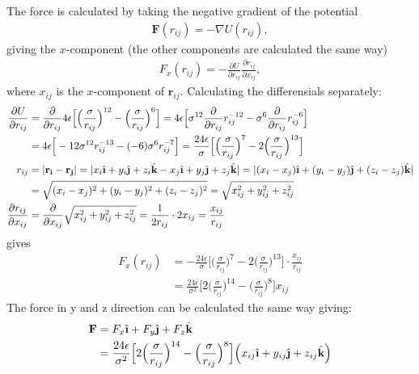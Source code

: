 \documentclass[11pt,a4wide]{article}
\renewcommand{\vec}{\mathbf}
\newcommand{\ihat}{\hat{\textbf{\i}}}
\newcommand{\jhat}{\hat{\textbf{\j}}}
\newcommand{\khat}{\hat{\textbf{k}}}
\begin{document}
The force is calculated by taking the negative gradient of the potential
\begin{align}
	\vec F(r_{ij}) = -\nabla U(r_{ij}),
\end{align}
giving the $x$-component (the other components are calculated the same way)
\begin{align}
	F_x(r_{ij}) = -\frac{\partial U}{\partial r_{ij}}\frac{\partial r_{ij}}{\partial x_{ij}},
\end{align}
where $x_{ij}$ is the $x$-component of $\vec r_{ij}$. Calculating the differensials separately:
\begin{align*}
\frac{\partial U}{\partial r_{ij}} &= \frac{\partial }{\partial r_{ij}} 4\epsilon\Big[\Big(\frac{\sigma}{r_{ij}}\Big)^{12} - \Big(\frac{\sigma}{r_{ij}}\Big)^6 \Big] =  4\epsilon\Big[ \sigma^{12}\frac{\partial }{\partial r_{ij}} r_{ij}^{-12} - \sigma^6 \frac{\partial }{\partial r_{ij}}r_{ij}^{-6} \Big] \\
&= 4\epsilon\Big[ -12\sigma^{12} r_{ij}^{-13} -(-6) \sigma^6 r_{ij}^{-7} \Big] = \frac{24\epsilon}{\sigma} \Big[\Big(\frac{\sigma}{r_{ij}}\Big)^{7} - 2\Big(\frac{\sigma}{r_{ij}}\Big)^{13} \Big] \\
r_{ij} &= |\vec{r_i} - \vec{r_j} | = | x_i\ihat + y_i\jhat + z_i\khat - x_j\ihat + y_j\jhat + z_j\khat | = | (x_i - x_j)\ihat + (y_i - y_j)\jhat + (z_i - z_j)\khat | \\
&= \sqrt{(x_i - x_j)^2 + (y_i - y_j)^2 + (z_i - z_j)^2} = \sqrt{x_{ij}^2 + y_{ij}^2 + z_{ij}^2} \\
\frac{\partial r_{ij}}{\partial x_{ij}} &= \frac{\partial}{\partial x_{ij}} \sqrt{x_{ij}^2 + y_{ij}^2 + z_{ij}^2} = \frac{1}{2r_{ij}}\cdot 2x_{ij} = \frac{x_{ij}}{r_{ij}}
\end{align*}
gives
\begin{align*}
F_x(r_{ij}) &= -\frac{24\epsilon}{\sigma} \Big[\Big(\frac{\sigma}{r_{ij}}\Big)^{7} - 2\Big(\frac{\sigma}{r_{ij}}\Big)^{13} \Big]\cdot \frac{x_{ij}}{r_{ij}} \\
&= \frac{24\epsilon}{\sigma^2} \Big[2\Big(\frac{\sigma}{r_{ij}}\Big)^{14} - \Big(\frac{\sigma}{r_{ij}}\Big)^{8} \Big]x_{ij}
\end{align*}
The force in y and z direction can be calculated the same way giving:
\begin{align*}
\vec F &= F_x\ihat + F_y \jhat + F_z\khat \\
&= \frac{24\epsilon}{\sigma^2} \Big[2\Big(\frac{\sigma}{r_{ij}}\Big)^{14} - \Big(\frac{\sigma}{r_{ij}}\Big)^{8} \Big]\Big(x_{ij}\ihat + y_{ij}\jhat + z_{ij}\khat \Big)
\end{align*}
\end{document}
